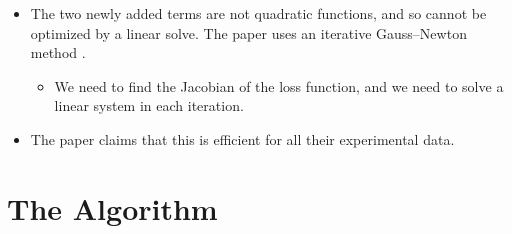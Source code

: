 \documentclass[10pt]{article}
\begin{document}
\begin{itemize}
\begin{itemize}
        \item The two newly added terms are not quadratic functions, and so cannot be optimized by a linear solve. The paper uses an iterative Gauss--Newton method \cite{Khungurn:NonLinearLeastSquaresAlgo}.
        \begin{itemize}
            \item We need to find the Jacobian of the loss function, and we need to solve a linear system in each iteration.
        \end{itemize}

        \item The paper claims that this is efficient for all their experimental data.
    \end{itemize}
\end{itemize}

\section{The Algorithm}
\end{document}
